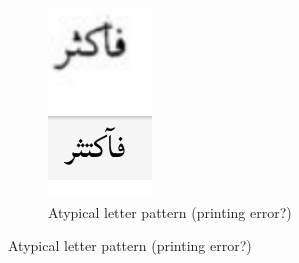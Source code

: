 \begin{figure}[h]
	\begin{subfigure}[b]{0.3\linewidth}
	\centering
	\includegraphics[width=\linewidth]{images/image24.png}
	\caption{Atypical letter pattern (printing error?)}
	\label{fig:fig13}
	\end{subfigure}


\end{figure}
